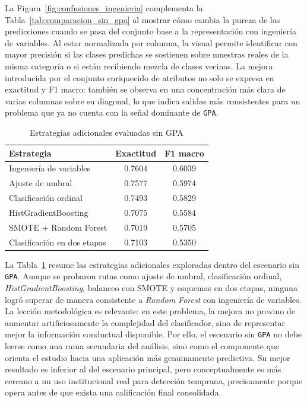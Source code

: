 \documentclass[conference]{IEEEtran}
\begin{document}
La Figura~\ref{fig:confusiones_ingenieria} complementa la Tabla~\ref{tab:comparacion_sin_gpa} al mostrar cómo cambia la pureza de las predicciones cuando se pasa del conjunto base a la representación con ingeniería de variables. Al estar normalizada por columna, la visual permite identificar con mayor precisión si las clases predichas se sostienen sobre muestras reales de la misma categoría o si están recibiendo mezcla de clases vecinas. La mejora introducida por el conjunto enriquecido de atributos no solo se expresa en exactitud y F1 macro: también se observa en una concentración más clara de varias columnas sobre su diagonal, lo que indica salidas más consistentes para un problema que ya no cuenta con la señal dominante de \texttt{GPA}.

\begin{table}[htbp]
\centering
\caption{Estrategias adicionales evaluadas sin GPA}
\scriptsize
\setlength{\tabcolsep}{4pt}
\begin{tabular}{lcc}
\toprule
Estrategia & Exactitud & F1 macro \\
\midrule
Ingeniería de variables & 0.7604 & 0.6039 \\
Ajuste de umbral & 0.7577 & 0.5974 \\
Clasificación ordinal & 0.7493 & 0.5829 \\
HistGradientBoosting & 0.7075 & 0.5584 \\
SMOTE + Random Forest & 0.7019 & 0.5705 \\
Clasificación en dos etapas & 0.7103 & 0.5350 \\
\bottomrule
\end{tabular}
\normalsize
\label{tab:estrategias_sin_gpa}
\end{table}

La Tabla~\ref{tab:estrategias_sin_gpa} resume las estrategias adicionales exploradas dentro del escenario sin \texttt{GPA}. Aunque se probaron rutas como ajuste de umbral, clasificación ordinal, \textit{HistGradientBoosting}, balanceo con SMOTE y esquemas en dos etapas, ninguna logró superar de manera consistente a \textit{Random Forest} con ingeniería de variables. La lección metodológica es relevante: en este problema, la mejora no provino de aumentar artificiosamente la complejidad del clasificador, sino de representar mejor la información conductual disponible. Por ello, el escenario sin \texttt{GPA} no debe leerse como una rama secundaria del análisis, sino como el componente que orienta el estudio hacia una aplicación más genuinamente predictiva. Su mejor resultado es inferior al del escenario principal, pero conceptualmente es más cercano a un uso institucional real para detección temprana, precisamente porque opera antes de que exista una calificación final consolidada.
\end{document}
